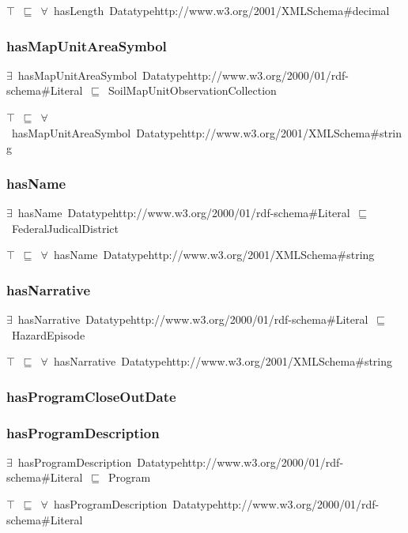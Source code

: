 \documentclass{article}
\begin{document}
\ensuremath{\top}~\ensuremath{\sqsubseteq}~\ensuremath{\forall}~hasLength~Datatypehttp://www.w3.org/2001/XMLSchema#decimal

\subsubsection*{hasMapUnitAreaSymbol}

\ensuremath{\exists}~hasMapUnitAreaSymbol~Datatypehttp://www.w3.org/2000/01/rdf-schema#Literal~\ensuremath{\sqsubseteq}~SoilMapUnitObservationCollection

\ensuremath{\top}~\ensuremath{\sqsubseteq}~\ensuremath{\forall}~hasMapUnitAreaSymbol~Datatypehttp://www.w3.org/2001/XMLSchema#string

\subsubsection*{hasName}

\ensuremath{\exists}~hasName~Datatypehttp://www.w3.org/2000/01/rdf-schema#Literal~\ensuremath{\sqsubseteq}~FederalJudicalDistrict

\ensuremath{\top}~\ensuremath{\sqsubseteq}~\ensuremath{\forall}~hasName~Datatypehttp://www.w3.org/2001/XMLSchema#string

\subsubsection*{hasNarrative}

\ensuremath{\exists}~hasNarrative~Datatypehttp://www.w3.org/2000/01/rdf-schema#Literal~\ensuremath{\sqsubseteq}~HazardEpisode

\ensuremath{\top}~\ensuremath{\sqsubseteq}~\ensuremath{\forall}~hasNarrative~Datatypehttp://www.w3.org/2001/XMLSchema#string

\subsubsection*{hasProgramCloseOutDate}

\subsubsection*{hasProgramDescription}

\ensuremath{\exists}~hasProgramDescription~Datatypehttp://www.w3.org/2000/01/rdf-schema#Literal~\ensuremath{\sqsubseteq}~Program

\ensuremath{\top}~\ensuremath{\sqsubseteq}~\ensuremath{\forall}~hasProgramDescription~Datatypehttp://www.w3.org/2000/01/rdf-schema#Literal
\end{document}
